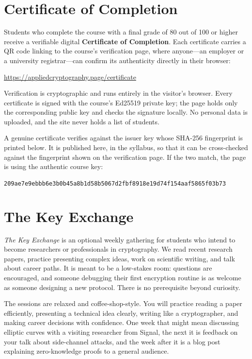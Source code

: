 \documentclass[10pt,a4paper,american]{exam}
\begin{document}
\section{Certificate of Completion}
Students who complete the course with a final grade of 80 out of 100 or higher receive a verifiable digital \textbf{Certificate of Completion}. Each certificate carries a QR code linking to the course's verification page, where anyone---an employer or a university registrar---can confirm its authenticity directly in their browser:
\begin{center}
	\url{https://appliedcryptography.page/certificate}
\end{center}

Verification is cryptographic and runs entirely in the visitor's browser. Every certificate is signed with the course's Ed25519 private key; the page holds only the corresponding public key and checks the signature locally. No personal data is uploaded, and the site never holds a list of students.

A genuine certificate verifies against the issuer key whose SHA-256 fingerprint is printed below. It is published here, in the syllabus, so that it can be cross-checked against the fingerprint shown on the verification page. If the two match, the page is using the authentic course key:
\begin{center}
	\texttt{209ae7e9ebbb6e3b0b45a8b1d58b5067d2fbf8918e19d74f154aaf5865f03b73}
\end{center}

\section{The Key Exchange}
\textit{The Key Exchange} is an optional weekly gathering for students who intend to become researchers or professionals in cryptography. We read recent research papers, practice presenting complex ideas, work on scientific writing, and talk about career paths. It is meant to be a low-stakes room: questions are encouraged, and someone debugging their first encryption routine is as welcome as someone designing a new protocol. There is no prerequisite beyond curiosity.

The sessions are relaxed and coffee-shop-style. You will practice reading a paper efficiently, presenting a technical idea clearly, writing like a cryptographer, and making career decisions with confidence. One week that might mean discussing elliptic curves with a visiting researcher from Signal, the next it is feedback on your talk about side-channel attacks, and the week after it is a blog post explaining zero-knowledge proofs to a general audience.
\end{document}

